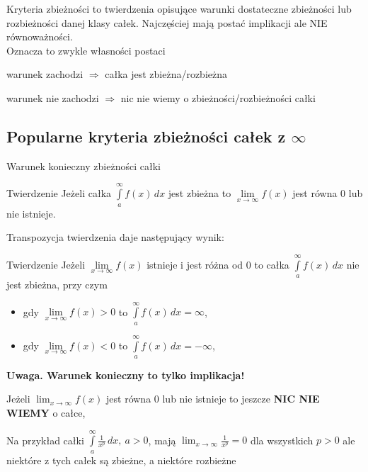 Kryteria zbieżności to twierdzenia opisujące warunki dostateczne zbieżności lub rozbieżności danej klasy
całek. Najczęściej mają postać implikacji ale NIE równoważności. \\

Oznacza to zwykle własności postaci

\quad warunek zachodzi $ \Rightarrow $ całka jest zbieżna/rozbieżna

\quad warunek nie zachodzi $ \Rightarrow $ nic nie wiemy o zbieżności/rozbieżności całki

\subsection{Popularne kryteria zbieżności całek z $\infty$}

Warunek konieczny zbieżności całki

\begin{tw}{Twierdzenie}
Jeżeli całka $ \int\limits_{a}^{\infty} f(x) \,dx $ jest zbieżna to 
$ \lim\limits_{x \to \infty} f(x) $ jest równa 0 lub nie istnieje.
\end{tw}

Transpozycja twierdzenia daje następujący wynik:

\begin{tw}{Twierdzenie}
Jeżeli $ \lim\limits_{x \to \infty} f(x) $ istnieje i jest różna od 0 to całka 
$ \int\limits_{a}^{\infty} f(x) \, dx $ nie jest zbieżna, przy czym

\begin{itemize}
    \item gdy $ \lim\limits_{x \to \infty} f(x) > 0 $ to $ \int\limits_{a}^{\infty} f(x) \,dx = \infty $,
    \item gdy $ \lim\limits_{x \to \infty} f(x) < 0 $ to $ \int\limits_{a}^{\infty} f(x) \,dx = -\infty $,
\end{itemize}

\end{tw}

\textbf{Uwaga. Warunek konieczny to tylko implikacja!}

Jeżeli $ \lim_{x \to \infty} f(x) $ jest równa 0 lub nie istnieje to jeszcze \textbf{NIC NIE WIEMY} o całce,

Na przykład całki $ \int\limits_{a}^{\infty} \frac{1}{x^p} \,dx, \ a > 0 $, mają
$ \lim_{x \to \infty} \frac{1}{x^p} = 0 $ dla wszystkich $ p > 0 $ ale niektóre z tych całek są zbieżne,
a niektóre rozbieżne \\

